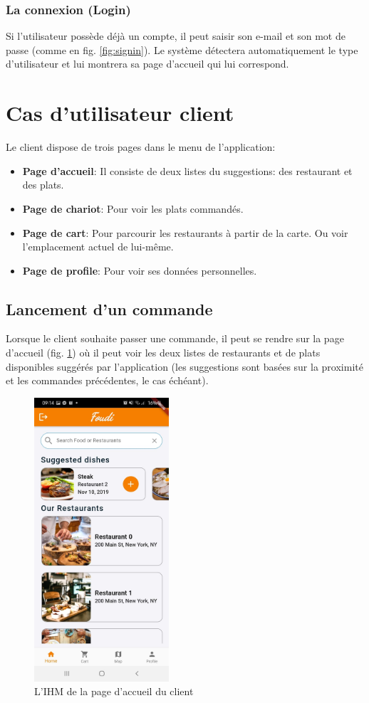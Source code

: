 \documentclass[french, a4paper, 12pt]{report}
\begin{document}
		\subsubsection{La connexion (Login)} Si l'utilisateur possède déjà un compte, il peut saisir son e-mail et son mot de passe (comme en fig. \ref{fig:signin}). Le système détectera automatiquement le type d'utilisateur et lui montrera sa page d'accueil qui lui correspond.
		 
	\newpage
	\section{Cas d'utilisateur client} Le client dispose de trois pages dans le menu de l'application:
		\begin{itemize}
			\item \textbf{Page d'accueil}: Il consiste de deux listes du suggestions: des restaurant et des plats.
			\item \textbf{Page de chariot}: Pour voir les plats commandés.
			\item \textbf{Page de cart}: Pour parcourir les restaurants à partir de la carte. Ou voir l'emplacement actuel de lui-même.
			\item \textbf{Page de profile}: Pour voir ses données personnelles.
		\end{itemize}
		\subsection{Lancement d'un commande}
			Lorsque le client souhaite passer une commande, il peut se rendre sur la page d'accueil (fig. \ref{fig:clihp}) où il peut voir les deux listes de restaurants et de plats disponibles suggérés par l'application (les suggestions sont basées sur la proximité et les commandes précédentes, le cas échéant).
			
			\begin{figure}[h!]
			\center
			\includegraphics[width=5cm]{screenshots/ClientViews/Homepage.jpg}
			\caption{L'IHM de la page d'accueil du client}
			\label{fig:clihp}
		\end{figure}
\end{document}
